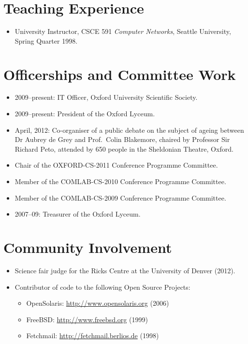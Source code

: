 \documentclass[letterpaper]{article}
\begin{document}
\section*{Teaching Experience} %

\begin{itemize}
    \item University Instructor, CSCE 591 \emph{Computer Networks},
    Seattle University, Spring Quarter 1998.
\end{itemize}

\section*{Officerships and Committee Work}
\begin{itemize}
	\item 2009--present: IT Officer, Oxford University Scientific Society.
	\item 2009--present: President of the Oxford Lyceum.
	\item April, 2012: Co-organiser of a public debate on the subject of ageing between
		Dr Aubrey de Grey and Prof.\ Colin Blakemore, chaired by Professor Sir Richard Peto,
		attended by 650 people in the Sheldonian Theatre, Oxford.
	\item Chair of the OXFORD-CS-2011 Conference Programme Committee.
	\item Member of the COMLAB-CS-2010 Conference Programme Committee.
	\item Member of the COMLAB-CS-2009 Conference Programme Committee.
	\item 2007--09: Treasurer of the Oxford Lyceum.
\end{itemize}

\section*{Community Involvement} %

\begin{itemize}
	\item Science fair judge for the Ricks Centre at the University of Denver (2012).
    \item Contributor of code to the following Open Source Projects:
		\begin{itemize}
			\item OpenSolaris: \url{http://www.opensolaris.org} (2006)
			\item FreeBSD: \url{http://www.freebsd.org} (1999)
			\item Fetchmail: \url{http://fetchmail.berlios.de} (1998)
		\end{itemize}
\end{itemize}
\end{document}
